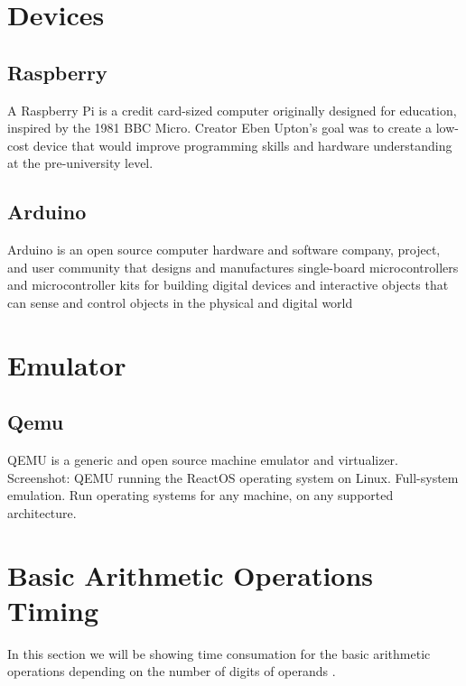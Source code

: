 \section{Devices}
\subsection{Raspberry}
A Raspberry Pi is a credit card-sized computer originally designed for education, inspired by the 1981 BBC Micro. Creator Eben Upton's goal was to create a low-cost device that would improve programming skills and hardware understanding at the pre-university level.
\subsection{Arduino}
Arduino is an open source computer hardware and software company, project, and user community that designs and manufactures single-board microcontrollers and microcontroller kits for building digital devices and interactive objects that can sense and control objects in the physical and digital world
\section{Emulator}
\subsection{Qemu}
QEMU is a generic and open source machine emulator and virtualizer. Screenshot: QEMU running the ReactOS operating system on Linux. Full-system emulation. Run operating systems for any machine, on any supported architecture.


\section{Basic Arithmetic Operations Timing}
In this section we will be showing time consumation for the basic arithmetic operations depending on the number of digits of operands .

